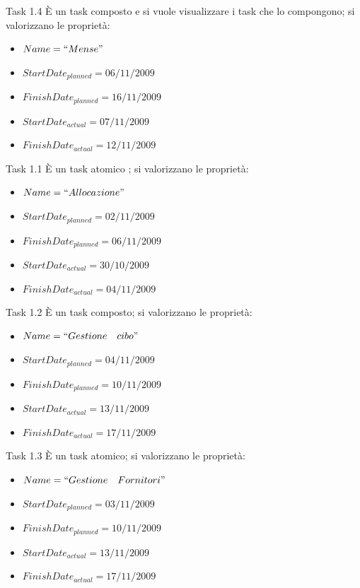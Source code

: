 \begin{taksDef}{Task 1.4} \`E un task composto e si vuole visualizzare i task che lo
compongono; si valorizzano le propriet\`a:
\begin{itemize}
  \item $Name = ``Mense"$
  \item $StartDate_{planned} = 06/11/2009$
  \item $FinishDate_{planned} = 16/11/2009$
  \item $StartDate_{actual} = 07/11/2009$
  \item $FinishDate_{actual} = 12/11/2009$
\end{itemize}
\end{taksDef}

\begin{taksDef}{Task 1.1} \`E un task atomico
; si valorizzano le propriet\`a:
\begin{itemize}
  \item $Name = ``Allocazione"$
  \item $StartDate_{planned} = 02/11/2009$
  \item $FinishDate_{planned} = 06/11/2009$
  \item $StartDate_{actual} = 30/10/2009$
  \item $FinishDate_{actual} = 04/11/2009$
\end{itemize}
\end{taksDef}

\begin{taksDef}{Task 1.2} \`E un task composto; si valorizzano le propriet\`a:
\begin{itemize}
  \item $Name = ``Gestione\quad cibo"$
  \item $StartDate_{planned} = 04/11/2009$
  \item $FinishDate_{planned} = 10/11/2009$
  \item $StartDate_{actual} = 13/11/2009$
  \item $FinishDate_{actual} = 17/11/2009$
\end{itemize}
\end{taksDef}

\begin{taksDef}{Task 1.3} \`E un task atomico; si valorizzano le propriet\`a:
\begin{itemize}
  \item $Name = ``Gestione\quad Fornitori"$
  \item $StartDate_{planned} = 03/11/2009$
  \item $FinishDate_{planned} = 10/11/2009$
  \item $StartDate_{actual} = 13/11/2009$
  \item $FinishDate_{actual} = 17/11/2009$
\end{itemize}
\end{taksDef}

